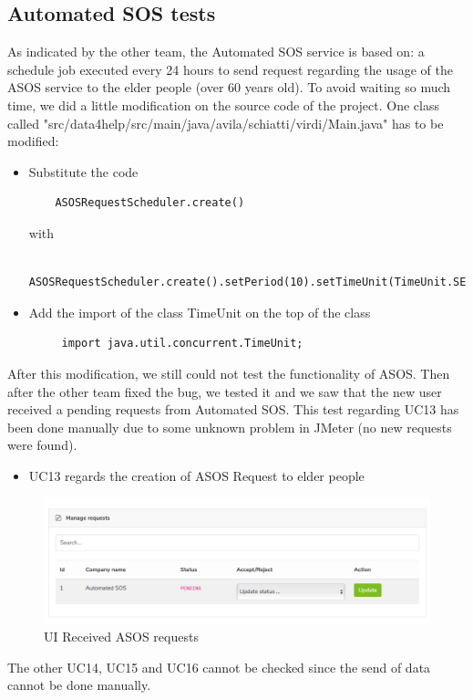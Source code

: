 \subsection{Automated SOS tests}
As indicated by the other team, the Automated SOS service is based on: a schedule job executed every 24 hours to send request regarding the usage of the ASOS service to the elder people (over 60 years old). To avoid waiting so much time, we did a little modification on the source code of the project. One class called "src/data4help/src/main/java/avila/schiatti/virdi/Main.java" has to be modified:
\begin{itemize}
\item Substitute the code
\begin{verbatim}
	ASOSRequestScheduler.create()
\end{verbatim}
with
\begin{verbatim}
	ASOSRequestScheduler.create().setPeriod(10).setTimeUnit(TimeUnit.SECONDS)
\end{verbatim}
\item Add the import of the class TimeUnit on the top of the class
\begin{verbatim}
	 import java.util.concurrent.TimeUnit;
\end{verbatim}
\end{itemize}
After this modification, we still could not test the functionality of ASOS. Then after the other team fixed the bug, we tested it and we saw that the new user received a pending requests from Automated SOS. This test regarding UC13 has been done manually due to some unknown problem in JMeter (no new requests were found). 
\begin{itemize}
\item UC13 regards the creation of ASOS Request to elder people
\end{itemize}

\begin{figure}[H]
\includegraphics[width=\linewidth]{images/pendingASOS}
\caption{ UI Received ASOS requests }
\label{fig:asosrequest}
\end{figure}

The other UC14, UC15 and UC16 cannot be checked since the send of data cannot be done manually.
